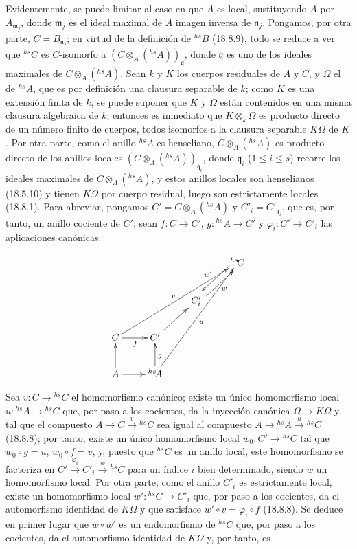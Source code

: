 Evidentemente, se puede limitar al caso en que $A$ es local, sustituyendo $A$ por $A_{\mathfrak m_j}$, donde $\mathfrak m_j$ es el ideal maximal de $A$ imagen inversa de $\mathfrak n_j$. Pongamos, por otra parte, $C=B_{\mathfrak n_j}$; en virtud de la definición de ${}^{hs}\!B$ (18.8.9), todo se reduce a ver que ${}^{hs}\!C$ es $C$-isomorfo a $(C\otimes_A({}^{hs}\!A))_{\mathfrak q}$, donde $\mathfrak q$ es uno de los ideales maximales de $C\otimes_A({}^{hs}\!A)$. Sean $k$ y $K$ los cuerpos residuales de $A$ y $C$, y $\Omega$ el de ${}^{hs}\!A$, que es por definición una clausura separable de $k$; como $K$ es una extensión finita de $k$, se puede suponer que $K$ y $\Omega$ están contenidos en una misma clausura algebraica de $k$; entonces es inmediato que $K\otimes_k\Omega$ es producto directo de un número finito de cuerpos, todos isomorfos a la clausura separable $K\Omega$ de $K$. Por otra parte, como el anillo ${}^{hs}\!A$ es henseliano, $C\otimes_A({}^{hs}\!A)$ es producto directo de los anillos locales $(C\otimes_A({}^{hs}\!A))_{\mathfrak q_i}$, donde $\mathfrak q_i$ ($1\leq i\leq s$) recorre los ideales maximales de $C\otimes_A({}^{hs}\!A)$, y estos anillos locales son henselianos (18.5.10) y tienen $K\Omega$ por cuerpo residual, luego son estrictamente locales (18.8.1). Para abreviar, pongamos $C'=C\otimes_A({}^{hs}\!A)$ y $C'_i=C'_{\mathfrak q_i}$, que es, por tanto, un anillo cociente de $C'$; sean $f:C\to C'$, $g:{}^{hs}\!A\to C'$ y $\varphi_i:C'\to C'_i$ las aplicaciones canónicas.

\[
\xymatrix{
  &&& {}^{hs}\!C \ar@<-0.8ex>[dl]_{w'} \\
  && C'_i \ar@<-0.8ex>[ur]_{w} \\
  C \ar[uurrr]^{v} \ar[r]_{f} & C' \ar[ur] \\
  A \ar[u] \ar[r] & {}^{hs}\!A \ar[u]_{g} \ar[uuurr]_{u}
}
\]

Sea $v:C\to{}^{hs}\!C$ el homomorfismo canónico; existe un único homomorfismo local $u:{}^{hs}\!A\to{}^{hs}\!C$ que, por paso a los cocientes, da la inyección canónica $\Omega\to K\Omega$ y tal que el compuesto $A\to C\xrightarrow{v}{}^{hs}\!C$ sea igual al compuesto $A\to{}^{hs}\!A\xrightarrow{u}{}^{hs}\!C$ (18.8.8); por tanto, existe un único homomorfismo local $w_0:C'\to{}^{hs}\!C$ tal que $w_0\circ g=u$, $w_0\circ f=v$, y, puesto que ${}^{hs}\!C$ es un anillo local, este homomorfismo se factoriza en $C'\xrightarrow{\varphi_i}C'_i\xrightarrow{w}{}^{hs}\!C$ para un índice $i$ bien determinado, siendo $w$ un homomorfismo local. Por otra parte, como el anillo $C'_i$ es estrictamente local, existe un homomorfismo local $w':{}^{hs}\!C\to C'_i$ que, por paso a los cocientes, da el automorfismo identidad de $K\Omega$ y que satisface $w'\circ v=\varphi_i\circ f$ (18.8.8). Se deduce en primer lugar que $w\circ w'$ es un endomorfismo de ${}^{hs}\!C$ que, por paso a los cocientes, da el automorfismo identidad de $K\Omega$ y, por tanto, es

